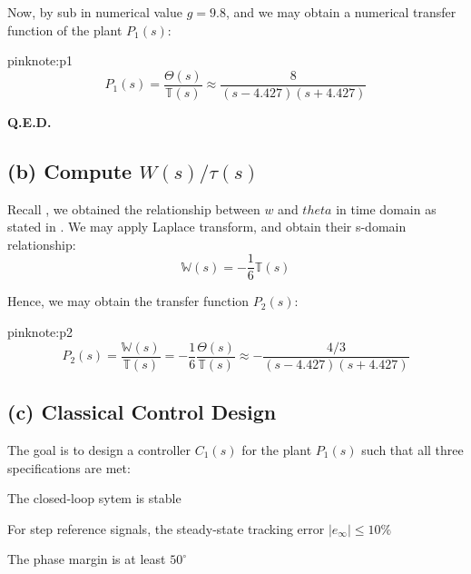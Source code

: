 \documentclass{tron}
\begin{document}
	Now, by sub in numerical value $g = 9.8$, and we may obtain a numerical transfer function of the plant $P_1(s)$:

	\begin{note}{pink}{note:p1}	
		\begin{equation}
			 P_1(s) = \frac{\Theta(s)}{\mathbb{T}(s)} \approx \frac{8}{(s-4.427)(s+4.427)} \label{eqn:p1}
		\end{equation}
	\end{note}
	
	\textbf{Q.E.D.}


\clearpage
\subsection{(b) Compute $W(s)/\tau(s)$\label{ans:P1-b}}
	Recall , we obtained the relationship between $w$ and $theta$ in time domain as stated in . We may apply Laplace transform, and obtain their s-domain relationship:
	\begin{equation}
		\mathbb{W}(s) = - \frac16 \mathbb{T}(s)
	\end{equation}
	
	Hence, we may obtain the transfer function $P_2(s)$:
	
	\begin{note}{pink}{note:p2}
		\begin{equation}
			P_2(s) = \frac{\mathbb{W}(s)}{\mathbb{T}(s)} = - \frac{1}{6} \frac{\Theta(s)}{\mathbb{T}(s)} \approx - \frac{4/3}{(s-4.427)(s+4.427)}
		\end{equation}
	\end{note}



\subsection{(c) Classical Control Design \label{ans:P1-c}}
	The goal is to design a controller $C_1(s)$ for the plant $P_1(s)$ such that all three specifications are met:
	\begin{spec-list}
		\item The closed-loop sytem is stable \label{spec:stable}
		\item For step reference signals, the steady-state tracking error $|e_\infty| \leq 10\%$ \label{spec:ess}
		\item The phase margin is at least $50^\circ$ \label{spec:pm}
	\end{spec-list}
\end{document}
